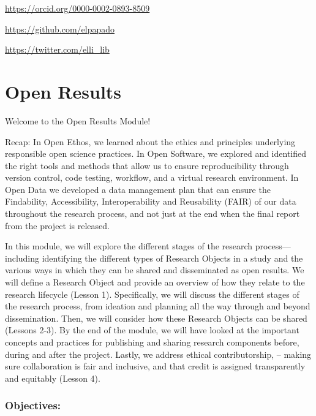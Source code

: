 \documentclass[
  letterpaper,
  DIV=11,
  numbers=noendperiod]{scrreport}
\begin{document}
\url{https://orcid.org/0000-0002-0893-8509}

\url{https://github.com/elpapado}

\url{https://twitter.com/elli_lib}

\part{Open Results}

Welcome to the Open Results Module!

Recap: In Open Ethos, we learned about the ethics and principles
underlying responsible open science practices. In Open Software, we
explored and identified the right tools and methods that allow us to
ensure reproducibility through version control, code testing, workflow,
and a virtual research environment. In Open Data we developed a data
management plan that can ensure the Findability, Accessibility,
Interoperability and Reusability (FAIR) of our data throughout the
research process, and not just at the end when the final report from the
project is released.

In this module, we will explore the different stages of the research
process---including identifying the different types of Research Objects
in a study and the various ways in which they can be shared and
disseminated as open results. We will define a Research Object and
provide an overview of how they relate to the research lifecycle (Lesson
1). Specifically, we will discuss the different stages of the research
process, from ideation and planning all the way through and beyond
dissemination. Then, we will consider how these Research Objects can be
shared (Lessons 2-3). By the end of the module, we will have looked at
the important concepts and practices for publishing and sharing research
components before, during and after the project. Lastly, we address
ethical contributorship, -- making sure collaboration is fair and
inclusive, and that credit is assigned transparently and equitably
(Lesson 4).

\hypertarget{objectives}{%
\section*{Objectives:}\label{objectives}}

\end{document}
